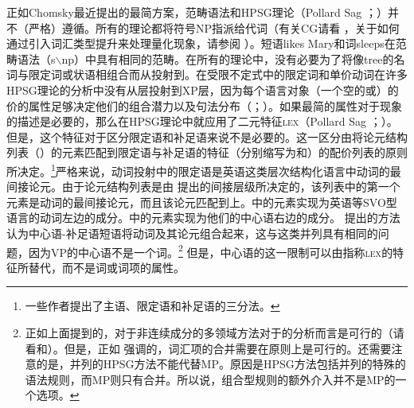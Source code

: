 正如Chomsky最近提出的最简方案，范畴语法\citep{Ajdukiewicz35a-u}和HPSG理论（Pollard \biband Sag \citeyear{ps}；\citeyear[--40]{ps2}）并不（严格）遵循\xbartc。所有的理论都将符号NP指派给代词（有关CG请看 ，关于如何通过引入词汇类型提升来处理量化现象，请参阅 ）。短语likes Mary和词sleeps在范畴语法（s$\backslash$np）中具有相同的范畴。在所有的理论中，没有必要为了将像tree的名词与限定词或状语相组合而从\nnullc 投射到\nbarc。在受限不定式中的限定词和单价动词在许多HPSG理论的分析中没有从\xzeroc 层投射到XP层，因为每个语言对象（一个空的\subcatc 或\compslc）的价的属性足够决定他们的组合潜力以及句法分布（\citealp{Mueller96a}；\citealp{Mueller99a}）。如果最简的属性对于现象的描述是必要的，那么在HPSG理论中就应用了二元特征\textsc{lex}（Pollard \biband Sag \citeyear[]{ps}；\citeyear[]{ps2}）。但是，这个特征对于区分限定语和补足语来说不是必要的。这一区分由将论元结构列表（\argstc）的元素匹配到限定语与补足语的特征（分别缩写为\sprc 和\compsc）的配价列表的原则所决定。\footnote{%
一些作者提出了主语、限定语和补足语的三分法。
}严格来说，动词投射中的限定语是英语这类层次结构化语言中动词的最间接论元。由于论元结构列表是由 \citet{KC77a}提出的间接层级所决定的，该列表中的第一个元素是动词的最间接论元，而且该论元匹配到\sprlc 上。\sprlc 中的元素实现为英语等SVO型语言的动词左边的成分。\compslc 中的元素实现为他们的中心语右边的成分。 \citet[, 364]{GSag2000a-u}提出的方法认为中心语-补足语短语将动词及其论元组合起来，这与这类并列具有相同的问题，因为VP的中心语不是一个词。\footnote{%
正如上面提到的，对于非连续成分的多领域方法对于的分析而言是可行的（请看\citealp{Crysmann2000a}和\citealp{BS2004a}）。但是，正如 \citet{Abeille2006a}强调的，词汇项的合并需要在原则上是可行的。还需要注意的是，并列的HPSG方法不能代替MP。原因是HPSG方法包括并列的特殊的语法规则，而MP则只有合并。所以说，组合型规则的额外介入并不是MP的一个选项。
} 
但是，中心语的这一限制可以由指称\textsc{lex}的特征所替代，而不是词或词项的属性。
